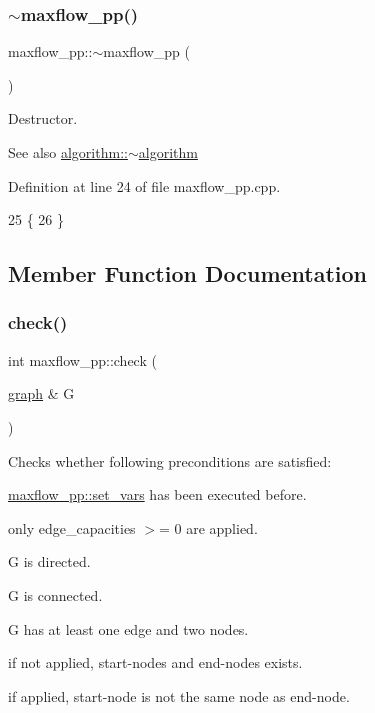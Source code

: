 \subsubsection{\texorpdfstring{$\sim$maxflow\+\_\+pp()}{~maxflow\_pp()}}
{\footnotesize\ttfamily maxflow\+\_\+pp\+::$\sim$maxflow\+\_\+pp (\begin{DoxyParamCaption}{ }\end{DoxyParamCaption})\hspace{0.3cm}{\ttfamily [virtual]}}

Destructor.

\begin{DoxySeeAlso}{See also}
\mbox{\hyperlink{classalgorithm_adca9b1e7fa3afd914519a9dbb44e9fd5}{algorithm\+::$\sim$algorithm}} 
\end{DoxySeeAlso}


Definition at line 24 of file maxflow\+\_\+pp.\+cpp.


\begin{DoxyCode}
25 \{
26 \}
\end{DoxyCode}


\subsection{Member Function Documentation}
\mbox{\label{classmaxflow__pp_a7ea24bd88999718e5e4e28ac028131cd}} 
\subsubsection{\texorpdfstring{check()}{check()}}
{\footnotesize\ttfamily int maxflow\+\_\+pp\+::check (\begin{DoxyParamCaption}\item[{\mbox{\hyperlink{classgraph}{graph}} \&}]{G }\end{DoxyParamCaption})\hspace{0.3cm}{\ttfamily [virtual]}}

Checks whether following preconditions are satisfied\+: 
\begin{DoxyItemize}
\item \mbox{\hyperlink{classmaxflow__pp_ac77f4c613efe7857e053f9bfb103dc3e}{maxflow\+\_\+pp\+::set\+\_\+vars}} has been executed before. 
\item only edge\+\_\+capacities $>$= 0 are applied. 
\item {\ttfamily G} is directed. 
\item {\ttfamily G} is connected. 
\item {\ttfamily G} has at least one edge and two nodes. 
\item if not applied, start-\/nodes and end-\/nodes exists. 
\item if applied, start-\/node is not the same node as end-\/node. 
\end{DoxyItemize}


